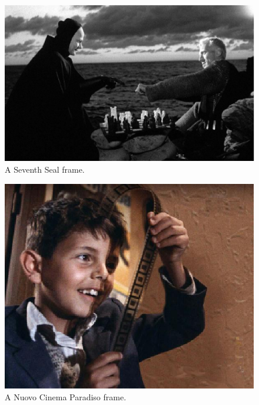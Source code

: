 \begin{figure}[ht!]
 \centering
 \includegraphics[scale=0.3]{image1.eps}
 \caption{A Seventh Seal frame.}
 \label{fig:example1}
\end{figure}

\begin{figure}[ht!]
 \centering
 \includegraphics[scale=0.4]{image2.eps}
 \caption{A Nuovo Cinema Paradiso frame.}
 \label{fig:example2}
\end{figure}

